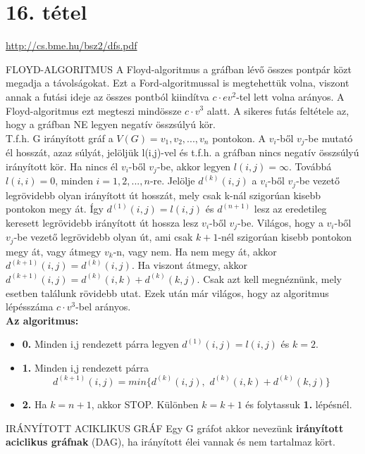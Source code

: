 \section{16. tétel}

\url{http://cs.bme.hu/bsz2/dfs.pdf}

\begin{tetel}{FLOYD-ALGORITMUS}
A Floyd-algoritmus a gráfban lévő összes pontpár közt megadja a távolságokat. Ezt a Ford-algoritmussal is megtehettük volna, viszont annak a futási ideje az összes pontból kiindítva $c\cdot ev^2$-tel lett volna arányos. A Floyd-algoritmus ezt megteszi mindössze $c\cdot v^3$ alatt. A sikeres futás feltétele az, hogy a gráfban NE legyen negatív összsúlyú kör.\\
T.f.h. G irányított gráf a $V(G) = {v_1, v_2,..., v_n}$ pontokon. A $v_i$-ből $v_j$-be mutató él hosszát, azaz súlyát, jelöljük l(i,j)-vel és t.f.h. a gráfban nincs negatív összsúlyú irányított kör. Ha nincs él $v_i$-ből $v_j$-be, akkor legyen $l(i,j) = \infty$. Továbbá $l(i,i) = 0$, minden $i = 1, 2,..., n$-re. Jelölje $d^{(k)}(i,j)$ a $v_i$-ből $v_j$-be vezető legrövidebb olyan irányított út hosszát, mely csak k-nál szigorúan kisebb pontokon megy át. Így $d^{(1)}(i,j) = l(i,j)$ és $d^{(n+1)}$ lesz az eredetileg keresett legrövidebb irányított út hossza lesz $v_i$-ből $v_j$-be. Világos, hogy a $v_i$-ből $v_j$-be vezető legrövidebb olyan út, ami csak $k + 1$-nél szigorúan kisebb pontokon megy át, vagy átmegy $v_k$-n, vagy nem. Ha nem megy át, akkor $d^{(k+1)}(i,j) = d^{(k)}(i,j)$. Ha viszont átmegy, akkor $d^{(k+1)}(i,j) = d^{(k)}(i,k) + d^{(k)}(k,j)$. Csak azt kell megnéznünk, mely esetben találunk rövidebb utat. Ezek után már világos, hogy az algoritmus lépésszáma $c\cdot v^3$-bel arányos.
\\
\textbf{Az algoritmus:}
\begin{itemize}
\item{\textbf{0.}} Minden i,j rendezett párra legyen $d^{(1)}(i,j) = l(i,j)$ és $k=2$.
\item{\textbf{1.}} Minden i,j rendezett párra
$$d^{(k+1)}(i,j) = min\{d^{(k)}(i,j),\,\, d^{(k)}(i,k) + d^{(k)}(k,j)\}$$
\item{\textbf{2.}} Ha $k = n + 1$, akkor STOP. Különben $k = k + 1$ és folytassuk \textbf{1.} lépésnél.
\end{itemize}
\end{tetel}

\begin{definicio}{IRÁNYÍTOTT ACIKLIKUS GRÁF}
Egy G gráfot akkor nevezünk \textbf{irányított aciclikus gráfnak} (DAG), ha irányított élei vannak és nem tartalmaz kört.
\end{definicio}

